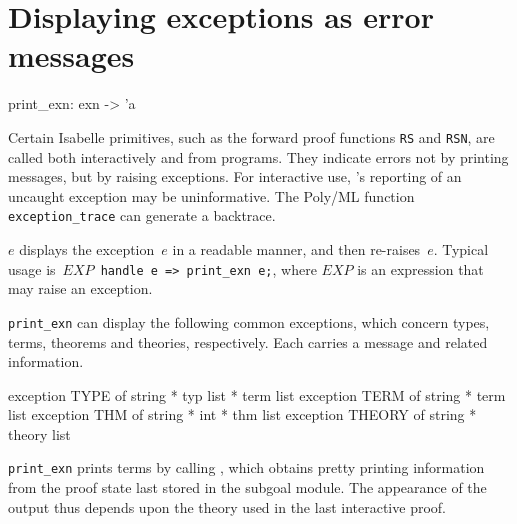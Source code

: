 \section{Displaying exceptions as error messages}
\begin{ttbox} 
print_exn: exn -> 'a
\end{ttbox}
Certain Isabelle primitives, such as the forward proof functions {\tt RS}
and {\tt RSN}, are called both interactively and from programs.  They
indicate errors not by printing messages, but by raising exceptions.  For
interactive use, \ML's reporting of an uncaught exception may be
uninformative.  The Poly/ML function {\tt exception_trace} can generate a
backtrace.

\begin{ttdescription}
\item[\ttindexbold{print_exn} $e$] 
displays the exception~$e$ in a readable manner, and then re-raises~$e$.
Typical usage is~\hbox{\tt $EXP$ handle e => print_exn e;}, where
$EXP$ is an expression that may raise an exception.

{\tt print_exn} can display the following common exceptions, which concern
types, terms, theorems and theories, respectively.  Each carries a message
and related information.
\begin{ttbox} 
exception TYPE   of string * typ list * term list
exception TERM   of string * term list
exception THM    of string * int * thm list
exception THEORY of string * theory list
\end{ttbox}
\end{ttdescription}
\begin{warn}
  {\tt print_exn} prints terms by calling , which obtains
  pretty printing information from the proof state last stored in the
  subgoal module.  The appearance of the output thus depends upon the
  theory used in the last interactive proof.
\end{warn}



